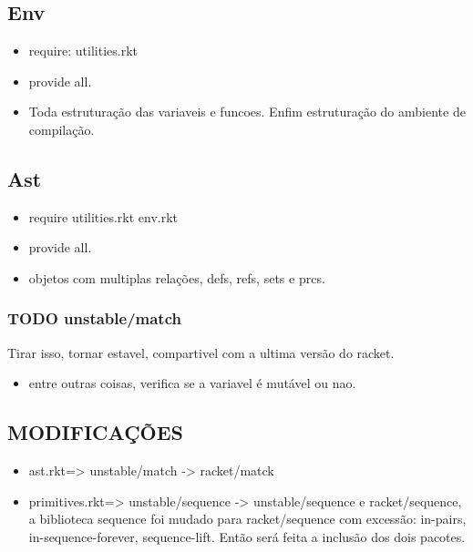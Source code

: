 \documentclass[11pt]{article}
\begin{document}
\subsection{Env}
\label{sec-7-3}

\begin{itemize}
\item require: utilities.rkt
\item provide all.
\item Toda estruturação das variaveis e funcoes. Enfim estruturação do ambiente de compilação.
\end{itemize}

\subsection{Ast}
\label{sec-7-4}
\begin{itemize}
\item require utilities.rkt env.rkt
\item provide all.
\item objetos com multiplas relações, defs, refs, sets e prcs.
\end{itemize}

\subsubsection{{\bfseries\sffamily TODO} unstable/match}
\label{sec-7-4-1}

Tirar isso, tornar estavel, compartivel com a ultima versão do racket.

\begin{itemize}
\item entre outras coisas, verifica se a variavel é mutável ou nao.
\end{itemize}

\subsection{MODIFICAÇÕES}
\label{sec-7-5}

\begin{itemize}
\item ast.rkt=> unstable/match -> racket/matck
\item primitives.rkt=> unstable/sequence -> unstable/sequence e racket/sequence, a biblioteca sequence foi mudado para racket/sequence com excessão: in-pairs, in-sequence-forever, sequence-lift. Então será feita a inclusão dos dois pacotes.
\end{itemize}
\end{document}
